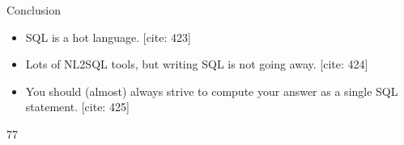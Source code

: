 \documentclass{beamer}
\begin{document}
\begin{frame}{Conclusion}
    \begin{itemize}
        \item SQL is a hot language. [cite: 423]
        \item Lots of NL2SQL tools, but writing SQL is not going away. [cite: 424]
        \item You should (almost) always strive to compute your answer as a single SQL statement. [cite: 425]
    \end{itemize}
    \vfill
    \hfill 77
\end{frame}
\end{document}
